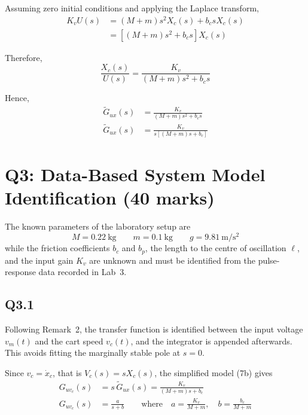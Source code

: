 \documentclass[11pt,a4paper]{article}
\begin{document}
Assuming zero initial conditions and applying the Laplace transform,
\begin{align*}
    K_{v} U(s) &= \left( M + m \right) s^{2} X_{c}(s) + b_{c} s X_{c}(s) \\
	&= \left[ \left( M + m \right) s^{2} + b_{c} s \right] X_{c}(s)
\end{align*}

Therefore,
\begin{equation*}
    \frac{X_{c}(s)}{U(s)} = \frac{K_{v}}{\left( M + m \right)s^{2}+b_{c}s}
\end{equation*}

Hence,
\begin{align}
    \tilde{G}_{ux}(s) &= \frac{K_{v}}{\left( M + m \right) s^{2} 
	+ b_{c} s} \tag{7a} \\
    \tilde{G}_{ux}(s) &= \frac{K_{v}}{s \left[ \left( M + m \right) s 
	+ b_{c} \right]} \tag{7b}
\end{align}

\section*{Q3: Data-Based System Model Identification \hfill (40 marks)}

The known parameters of the laboratory setup are
\begin{equation*}
	M = 0.22~\mathrm{kg} \qquad m = 0.1~\mathrm{kg}
	\qquad g = 9.81~\mathrm{m/s^{2}}
\end{equation*}
while the friction coefficients $b_{c}$ and $b_{p}$, the length to the centre
of oscillation $\ell$, and the input gain $K_{v}$ are unknown and must be
identified from the pulse-response data recorded in Lab~3.

\subsection*{Q3.1}

Following Remark~2, the transfer function is identified between the input
voltage $v_{m}(t)$ and the cart speed $v_{c}(t)$, and the integrator is
appended afterwards. This avoids fitting the marginally stable pole at
$s = 0$.

Since $v_{c} = \dot{x}_{c}$, that is $V_{c}(s) = s X_{c}(s)$, the simplified
model (7b) gives
\begin{align*}
	G_{uv_{c}}(s) &= s\,\tilde{G}_{ux}(s)
	= \frac{K_{v}}{\left( M + m \right) s + b_{c}} \tag{8a} \\
	G_{uv_{c}}(s) &= \frac{a}{s + b}
	\qquad \text{where} \quad a = \frac{K_{v}}{M+m},
	\quad b = \frac{b_{c}}{M+m} \tag{8b}
\end{align*}
\end{document}
